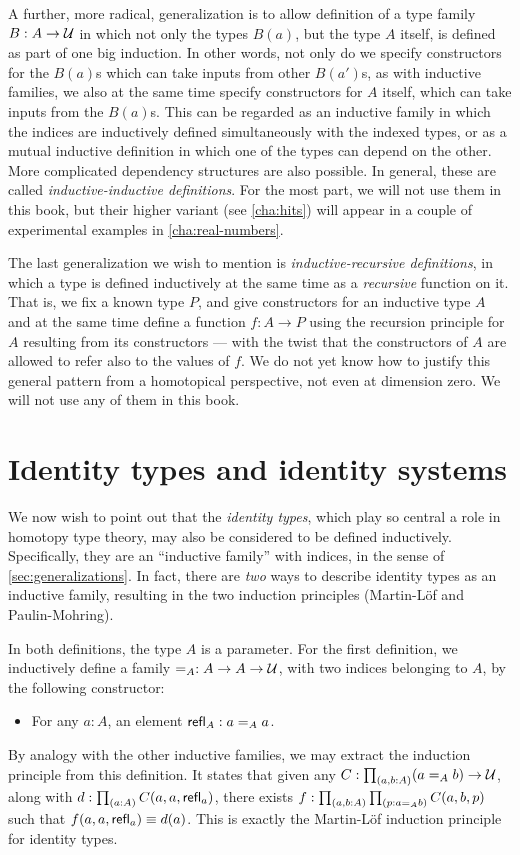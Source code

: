 A further, more radical, generalization is to allow definition of a type family $B:A\to \mathcal{U}$ in which not only the types $B(a)$, but the type $A$ itself, is defined as part of one big induction.
In other words, not only do we specify constructors for the $B(a)$s which can take inputs from other $B(a')$s, as with inductive families, we also at the same time specify constructors for $A$ itself, which can take inputs from the $B(a)$s.
This can be regarded as an inductive family in which the indices are inductively defined simultaneously with the indexed types, or as a mutual inductive definition in which one of the types can depend on the other.
More complicated dependency structures are also possible.
In general, these are called \emph{inductive-inductive definitions}.
For the most part, we will not use them in this book, but their higher variant (see \autoref{cha:hits}) will appear in a couple of experimental examples in \autoref{cha:real-numbers}.

The last generalization we wish to mention is \emph{inductive-recursive definitions}, in which a type is defined inductively at the same time as a \emph{recursive} function on it.
That is, we fix a known type $P$, and give constructors for an inductive type $A$ and at the same time define a function $f:A\to P$ using the recursion principle for $A$ resulting from its constructors --- with the twist that the constructors of $A$ are allowed to refer also to the values of $f$.
We do not yet know how to justify this general pattern from a homotopical perspective, not even at dimension zero. We will not use any of
them in this book.


\section{Identity types and identity systems}
\label{sec:identity-systems}

We now wish to point out that the \emph{identity types}, which play so central a role in homotopy type theory, may also be considered to be defined inductively.
Specifically, they are an ``inductive family'' with indices, in the sense of \autoref{sec:generalizations}.
In fact, there are \emph{two} ways to describe identity types as an inductive family, resulting in the two induction principles (Martin-L\"of and Paulin-Mohring).

In both definitions, the type $A$ is a parameter.
For the first definition, we inductively define a family $=_A : A\to A\to \mathcal{U}$, with two indices belonging to $A$, by the following constructor:
\begin{itemize}
\item For any $a:A$, an element $\mathsf{refl}_{A} : a=_A a$.
\end{itemize}
By analogy with the other inductive families, we may extract the induction principle from this definition.
It states that given any $C:\prd{a,b:A} (a=_A b) \to \type$, along with $d:\prd{a:A} C(a,a,\refl{a})$, there exists $f:\prd{a,b:A}{p:a=_A b} C(a,b,p)$ such that $f(a,a,\mathsf{refl}_{a})\equiv d(a)$.
This is exactly the Martin-L\"of induction principle for identity types.

